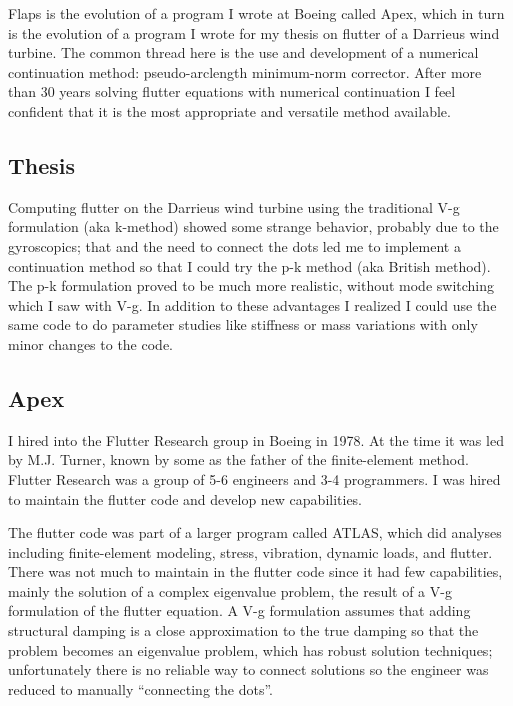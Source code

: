 \documentclass[11pt,openany,twoside]{book}
\numberwithin{equation}{section}		%
\begin{document}
Flaps is the evolution of a program I wrote at Boeing called Apex,
which in turn is the evolution of a program I wrote for my thesis on
flutter of a Darrieus wind turbine.
The common thread here is the use and development of a numerical continuation
method: pseudo-arclength minimum-norm corrector.
After more than 30 years solving flutter equations with numerical continuation
I feel confident that it is the most appropriate and versatile method available.

\subsection{Thesis}
Computing flutter on the Darrieus wind turbine using the traditional
V-g formulation (aka k-method) showed some strange behavior, probably
due to the gyroscopics; that and the need to connect the dots led me
to implement a continuation method so that I could try the p-k
method \cite{hassig1971approximate} (aka British method).
The p-k formulation proved to be
much more realistic, without mode switching which I saw with V-g.
In addition to these advantages I realized I could use the same code
to do parameter studies like stiffness or mass variations with only
minor changes to the code.

\subsection{Apex}
I hired into the Flutter Research group in Boeing in 1978. At the time it was
led by M.J. Turner, known by some as the father of the finite-element method.
Flutter Research was a group of 5-6 engineers and 3-4 programmers.
I was hired to maintain the flutter code and develop new capabilities.

The flutter code was part of a larger program called ATLAS, which did
analyses including finite-element modeling, stress, vibration, dynamic loads,
and flutter. There was not much to maintain in the flutter code since it
had few capabilities, mainly the solution of a complex eigenvalue problem,
the result of a V-g formulation of the flutter equation.
A V-g formulation assumes that adding structural damping is a close
approximation to the true damping so that the problem becomes an
eigenvalue problem, which has robust solution techniques;
unfortunately there is no reliable way to connect solutions so the
engineer was reduced to manually ``connecting the dots''.
\end{document}
